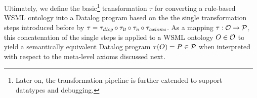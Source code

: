 \medskip

Ultimately, we define the basic\footnote{Later on, the
transformation pipeline is further extended to support datatypes
and debugging.} transformation $\tau$ for converting a rule-based
WSML ontology into a Datalog program based on the the single
transformation steps introduced before by $ \tau = \transdlog
\circ \translt \circ \transnorm \circ \transax$.
As a mapping $\tau: \O \rightarrow \P$, this concatenation of the
single steps is applied to a WSML ontology $O \in \O$ to yield a
semantically equivalent Datalog program $\tau (O) = P \in \P$ when
interpreted with respect to the meta-level axioms discussed next.
